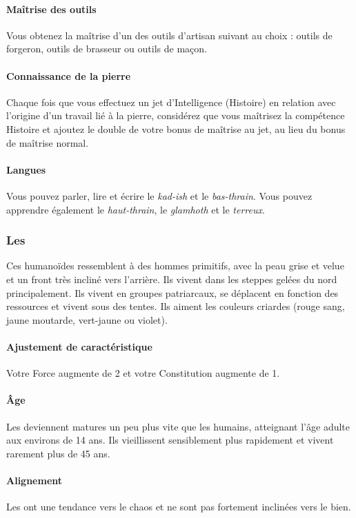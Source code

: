 \documentclass[a4paper,10pt,openany]{book}
\begin{document}
\begin{multicols}{2}
\paragraph{Maîtrise des outils}
Vous obtenez la maîtrise d’un des outils d’artisan suivant au choix : outils de forgeron, outils de brasseur ou outils de maçon.
\paragraph{Connaissance de la pierre}
Chaque fois que vous effectuez un jet d’Intelligence (Histoire) en relation avec l’origine d’un travail lié à la pierre, considérez que vous maîtrisez
la compétence Histoire et ajoutez le double de votre bonus de maîtrise au jet, au lieu du bonus de maîtrise normal.
\paragraph{Langues}
Vous pouvez parler, lire et écrire le \emph{kad-ish} et le \emph{bas-thrain}. Vous pouvez apprendre également le \emph{haut-thrain}, le
\emph{glamhoth} et le \emph{terreux}.

\subsubsection{Les \DemiOrcs}
Ces humanoïdes ressemblent à des hommes primitifs, avec la peau grise et velue et un front très incliné vers l’arrière. Ils vivent dans les steppes
gelées du nord principalement. Ils vivent en groupes patriarcaux, se déplacent en fonction des ressources et vivent sous des tentes. Ils aiment les
couleurs criardes (rouge sang, jaune moutarde, vert-jaune ou violet).
\paragraph{Ajustement de caractéristique}
Votre Force augmente de 2 et votre Constitution augmente de 1.
\paragraph{\^Age}
Les \DemiOrcs deviennent matures un peu plus vite que les humains, atteignant l’âge adulte aux environs de 14 ans. Ils vieillissent sensiblement plus
rapidement et vivent rarement plus de 45 ans.
\paragraph{Alignement}
Les \DemiOrcs ont une tendance vers le chaos et ne sont pas fortement inclinées vers le bien.

\end{multicols}
\end{document}
